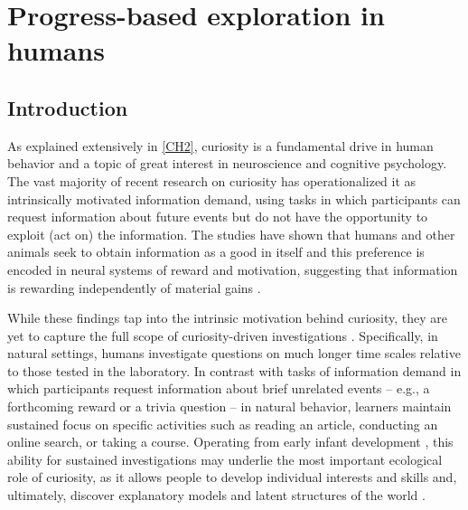 \chapter{Progress-based exploration in humans}\label{CH4}

\section{Introduction}\label{CH4_S_introduction}
As explained extensively in \cref{CH2}, curiosity is a fundamental drive in human behavior and a topic of great interest in neuroscience and cognitive psychology. The vast majority of recent research on curiosity has operationalized it as intrinsically motivated information demand, using tasks in which participants can request information about future events but do not have the opportunity to exploit (act on) the information. The studies have shown that humans and other animals seek to obtain information as a good in itself and this preference is encoded in neural systems of reward and motivation, suggesting that information is rewarding independently of material gains \parencite{duan2020effect,lau2020shared,kang_wick_2009,bromberg-martin_midbrain_2009}.

While these findings tap into the intrinsic motivation behind curiosity, they are yet to capture the full scope of curiosity-driven investigations \parencite{gottlieb_towards_2018}. Specifically, in natural settings, humans investigate questions on much longer time scales relative to those tested in the laboratory. In contrast with  tasks of information demand in which participants request information about brief unrelated events – e.g., a forthcoming reward or a trivia question – in natural behavior, learners maintain sustained focus on specific activities such as reading an article, conducting an online search, or taking a course. Operating from early infant development \parencite{bazhydai_curiosity_2020}, this ability for sustained investigations may underlie the most important ecological role of curiosity, as it allows people to develop individual interests and skills and, ultimately, discover explanatory models and latent structures of the world \parencite{hidi_interest_2019,schwartenbeck_computational_2019,dubey_reconciling_2020}.


